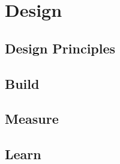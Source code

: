 
\chapter{Design}

\ifpdf
    \graphicspath{{Chapters/Design/Figs/}{Chapters/Design/Figs/}{Chapters/Design/Figs/}}
\else
    \graphicspath{{Chapters/Design/Figs/}{Chapters/Design/Figs/}}
\fi

\section{Design Principles}

\section{Build}

\section{Measure}

\section{Learn}
